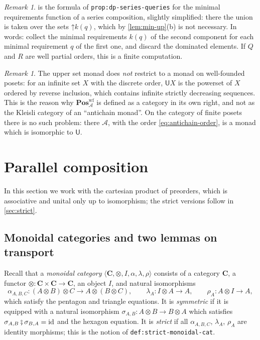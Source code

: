 \documentclass[11pt,a4paper]{article}
\theoremstyle{plain}
\theoremstyle{definition}
\theoremstyle{remark}
\newtheorem{remark}[theorem]{Remark}
\newcommand{\Cat}[1]{\mathbf{#1}}
\newcommand{\Pos}{\Cat{Pos}}
\newcommand{\U}{\mathsf{U}}
\newcommand{\An}{\mathcal{A}}
\newcommand{\PosA}{\Pos^{\mathrm{wf}}_{\An}}
\newcommand{\then}{\mathbin{\fatsemi}}
\newcommand{\tup}[1]{\langle #1 \rangle}
\newcommand{\up}{\mathord{\uparrow}}
\newcommand{\id}{\mathrm{id}}
\newcommand{\lbl}[1]{\nolinkurl{#1}}
\begin{document}
\begin{remark}
    \label{rem:book-series-queries}
     is the formula of \lbl{prop:dp-series-queries} for the minimal requirements function of a series composition, slightly simplified: there the union is taken over the sets $\up k(q)$, which by \cref{lem:min-up}(b) is not necessary.
    In words: collect the minimal requirements $k(q)$ of the second component for each minimal requirement $q$ of the first one, and discard the dominated elements.
    If $Q$ and $R$ are well partial orders, this is a finite computation.
\end{remark}

\begin{remark}
    The upper set monad does \emph{not} restrict to a monad on well-founded posets: for an infinite set $X$ with the discrete order, $\U X$ is the powerset of $X$ ordered by reverse inclusion, which contains infinite strictly decreasing sequences.
    This is the reason why $\PosA$ is defined as a category in its own right, and not as the Kleisli category of an ``antichain monad''.
    On the category of finite posets there is no such problem: there $\An$, with the order \cref{eq:antichain-order}, is a monad which is isomorphic to $\U$.
\end{remark}

\section{Parallel composition}
\label{sec:parallel}

In this section we work with the cartesian product of preorders, which is associative and unital only up to isomorphism; the strict versions follow in \cref{sec:strict}.

\subsection{Monoidal categories and two lemmas on transport}

Recall that a \emph{monoidal category} $\tup{\Cat{C}, \otimes, I, \alpha, \lambda, \rho}$ consists of a category $\Cat{C}$, a functor $\otimes \colon \Cat{C} \times \Cat{C} \to \Cat{C}$, an object $I$, and natural isomorphisms
\begin{equation*}
    \alpha_{A,B,C} \colon (A \otimes B) \otimes C \to A \otimes (B \otimes C),
    \qquad
    \lambda_A \colon I \otimes A \to A,
    \qquad
    \rho_A \colon A \otimes I \to A,
\end{equation*}
which satisfy the pentagon and triangle equations.
It is \emph{symmetric} if it is equipped with a natural isomorphism $\sigma_{A,B} \colon A \otimes B \to B \otimes A$ which satisfies $\sigma_{A,B} \then \sigma_{B,A} = \id$ and the hexagon equation.
It is \emph{strict} if all $\alpha_{A,B,C}$, $\lambda_A$, $\rho_A$ are identity morphisms; this is the notion of \lbl{def:strict-monoidal-cat}.
\end{document}
